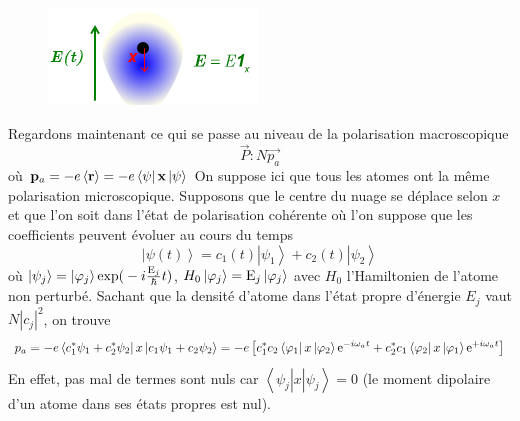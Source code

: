 	\begin{figure}
	\vspace{-5mm}
	\includegraphics[scale=0.86]{ch3/image9.png}
	\end{figure}
Regardons maintenant ce qui se passe au niveau de la polarisation macroscopique
\begin{equation}
\vec{P}: N\vec{p_a}
\end{equation}
où ${{\bf{p}}_a} =  - e\left\langle {\bf{r}} \right\rangle  =  - e\left\langle \psi  \right|{\bf{x}}\left| \psi  \right\rangle$
On suppose ici que tous les atomes ont la même polarisation microscopique. Supposons que le 
centre du nuage se déplace selon $x$ et que l'on soit dans l'état de polarisation cohérente où l'on 
suppose que les coefficients peuvent évoluer au cours du temps
\begin{equation}
\left| {\psi (t)} \right\rangle  = {c_1}(t)\left| {{\psi _1}} \right\rangle  + {c_2}(t)\left| {{\psi _2}} \right\rangle 
\end{equation}
où $\left| {{\psi _j}} \right\rangle  = \left| {{\varphi _j}} \right\rangle {\rm{exp(}} - i\frac{{{{\rm{E}}_j}}}{\hbar }t{\rm{)}}$, ${{H}_0}\left| {{\varphi _j}} \right\rangle  = {{\rm{E}}_j}\left| {{\varphi _j}} \right\rangle$ avec $H_0$ l'Hamiltonien de l'atome non perturbé. Sachant que 
la densité d'atome dans l'état propre d'énergie $E_j$ vaut $N|c_j|^2$, on trouve
\begin{equation}
{p_a} =  - e\left\langle {c_1^*{\psi _1} + c_2^*{\psi _2}} \right|x\left| {{c_1}{\psi _1} + {c_2}{\psi _2}} \right\rangle  =  - e\left[ {c_1^*{c_2}\left\langle {{\varphi _1}} \right|x\left| {{\varphi _2}} \right\rangle {{\rm{e}}^{ - i{\omega _a}t}} + c_2^*{c_1}\left\langle {{\varphi _2}} \right|x\left| {{\varphi _1}} \right\rangle {{\rm{e}}^{ + i{\omega _a}t}}} \right]
\end{equation}
En effet, pas mal de termes sont nuls car $\left\langle {{\psi _j}} \right|x\left| {{\psi _j}} \right\rangle  = 0$ (le moment dipolaire d'un atome dans ses états propres est nul).\\

